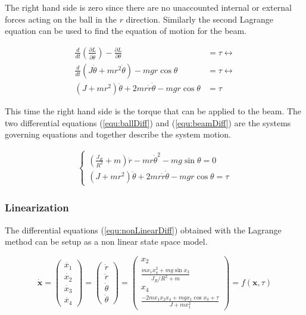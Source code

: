 \documentclass[a4paper, titlepage]{article}
\begin{document}
The right hand side is zero since there are no unaccounted internal or external forces acting on the ball in the $r$ direction.
Similarly the second Lagrange equation can be used to find the equation of motion for the beam.

\begin{equation}
\begin{split}
\frac{d}{dt}\left(\frac{\partial L}{\partial \dot{\theta}}\right) - \frac{\partial L}{\partial \theta} &= \tau \leftrightarrow \\
\frac{d}{dt}\left(J\dot{\theta} + mr^2\dot{\theta}\right) - mgr\cos{\theta} &= \tau \leftrightarrow \\
(J + mr^2)\ddot{\theta} + 2mr\dot{r}\dot{\theta} - mgr\cos{\theta} &= \tau
\end{split}
\label{equ:beamDiff}
\end{equation}

This time the right hand side is the torque that can be applied to the beam.
The two differential equations (\ref{equ:ballDiff}) and (\ref{equ:beamDiff}) are the systems governing equations and together describe the system motion.

\begin{equation}
\begin{split}
\begin{cases}
\left(\frac{J_R}{R^2} + m\right)\ddot{r} - mr\dot{\theta}^2 - mg\sin{\theta} = 0 \\
(J + mr^2)\ddot{\theta} + 2mr\dot{r}\dot{\theta} - mgr\cos{\theta} = \tau
\end{cases}
\end{split}
\label{equ:nonLinearDiff}
\end{equation}

\subsubsection{Linearization}
The differential equations (\ref{equ:nonLinearDiff}) obtained with the Lagrange method can be setup as a non linear state space model.

\begin{equation}
\dot{\textbf{x}} = 
\begin{pmatrix}
\dot{x_1} \\ \dot{x_2} \\ \dot{x_3} \\ \dot{x_4}
\end{pmatrix} = 
\begin{pmatrix}
\dot{r} \\ \ddot{r} \\ \dot{\theta} \\ \ddot{\theta}
\end{pmatrix} = 
\begin{pmatrix}
x_2 \\ 
\frac{mx_1x_4^2 + mg\sin{x_3}}{J_R/R^2 + m} \\ 
x_4 \\ 
\frac{- 2mx_1x_2x_4 + mgx_1\cos{x_3} + \tau}{J + mx_1^2}
\end{pmatrix} = f(\textbf{x}, \tau)
\label{equ:nonLinSs}
\end{equation}
\end{document}

